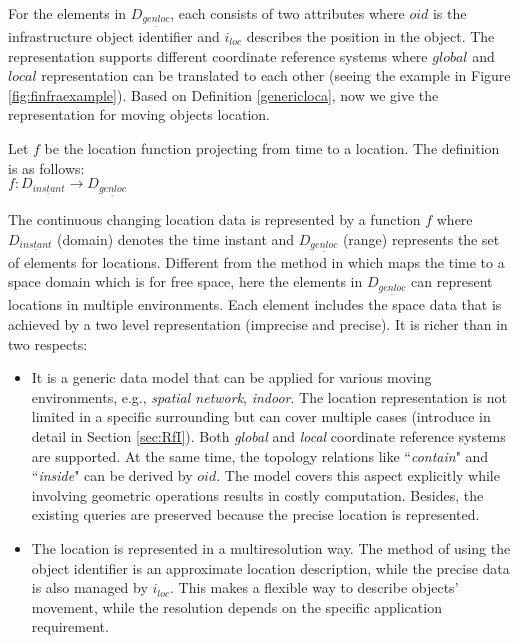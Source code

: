 For the elements in $D_{\underline{genloc}}$, each consists of two attributes where $oid$ is the 
infrastructure object identifier and $i_{loc}$ describes the position in the object.
The representation supports different coordinate reference systems where $global$ and 
$local$ representation can be translated to each other (seeing the example in Figure \ref{fig:finfraexample}). Based on Definition \ref{genericloca}, now we give the representation for 
moving objects location. 

\begin{Statement}
\label{abstractm}
Let $f$ be the location function projecting from time to a location. 
The definition is as follows: \\

\hspace{2cm} $f: D_{\underline{instant}} \rightarrow D_{\underline{genloc}}$
\end{Statement}

The continuous changing location data is represented by a
function $f$ where $D_{\underline{instant}}$ (domain) denotes the time instant and 
$D_{\underline{genloc}}$ (range) represents the set of elements for locations. 
Different from the method in \cite{FG+00,GBE+00} which maps the time to a space 
domain which is for free space, here the elements in $D_{\underline{genloc}}$ can represent locations in multiple environments. Each element includes the space data that is achieved by a two level representation (imprecise and precise). It is richer than \cite{GBE+00} in two respects: 
\begin{itemize}
 \item It is a generic data model that can be applied for various moving environments, 
e.g., \textit{spatial network}, \textit{indoor}. The location representation is not limited in a specific 
surrounding but can cover multiple cases (introduce in detail in Section \ref{sec:RfI}). 
Both \textit{global} and \textit{local} coordinate reference systems are supported. 
At the same time, the topology relations like ``\textit{contain}" and ``\textit{inside}" can be 
derived by $oid$. The model covers this aspect explicitly while involving geometric operations results in costly computation. Besides, the existing queries are preserved because the precise location 
is represented.
 
 \item The location is represented in a multiresolution way. The method of using the object identifier
is an approximate location description, while the precise data is also managed by $i_{loc}$. This 
makes a flexible way to describe objects' movement, while the resolution
depends on the specific application requirement. 
\end{itemize}


